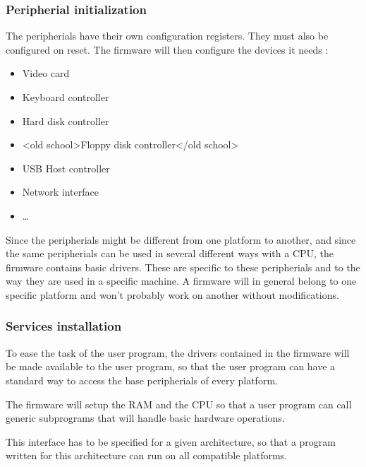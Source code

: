 \begin{frame}
  \frametitle{Peripherial initialization}

  The peripherials have their own configuration registers. They must also be configured on reset. The firmware will then configure the devices it needs :

  \-

  \begin{itemize}
  \item Video card
  \item Keyboard controller
  \item Hard disk controller
  \item {<old school>Floppy disk controller</old school>}
  \item USB Host controller
  \item Network interface
  \item \ldots
  \end{itemize}

  \-

  Since the peripherials might be different from one platform to another, and since the same peripherials can be used in several different ways with a CPU, the firmware contains basic drivers. These are specific to these peripherials and to the way they are used in a specific machine. A firmware will in general belong to one specific platform and won't probably work on another without modifications.

\end{frame}

\begin{frame}
  \frametitle{Services installation}

  To ease the task of the user program, the drivers contained in the firmware will be made available to the user program, so that the user program can have a standard way to access the base peripherials of every platform.

  \-

  The firmware will setup the RAM and the CPU so that a user program can call generic subprograms that will handle basic hardware operations.

  \-

  This interface has to be specified for a given architecture, so that a program written for this architecture can run on all compatible platforms.

\end{frame}

